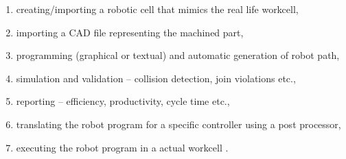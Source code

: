 \begin{enumerate}
  \item creating/importing a robotic cell that mimics the real life workcell,
  \item importing a CAD file representing the machined part,
  \item programming (graphical or textual) and automatic generation of robot path,
  \item simulation and validation -- collision detection, join violations etc.,
  \item reporting -- efficiency, productivity, cycle time etc.,
  \item translating the robot program for a specific controller using a post processor,
  \item executing the robot program in a actual workcell \cite{offlinesteps}.
\end{enumerate}
